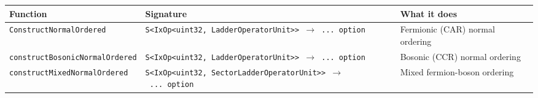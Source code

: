 \documentclass[
  11pt,
  oneside]{book}
\begin{document}
\begin{longtable}[]{@{}
  >{\raggedright\arraybackslash}p{}
  >{\raggedright\arraybackslash}p{}
  >{\raggedright\arraybackslash}p{}@{}}
\toprule\noalign{}
\begin{minipage}[b]{\linewidth}\raggedright
Function
\end{minipage} & \begin{minipage}[b]{\linewidth}\raggedright
Signature
\end{minipage} & \begin{minipage}[b]{\linewidth}\raggedright
What it does
\end{minipage} \\
\midrule\noalign{}
\endhead
\bottomrule\noalign{}
\endlastfoot
\texttt{ConstructNormalOrdered} &
\texttt{S\textless{}IxOp\textless{}uint32,\ LadderOperatorUnit\textgreater{}\textgreater{}\ $\rightarrow$\ ...\ option}
& Fermionic (CAR) normal ordering \\
\texttt{constructBosonicNormalOrdered} &
\texttt{S\textless{}IxOp\textless{}uint32,\ LadderOperatorUnit\textgreater{}\textgreater{}\ $\rightarrow$\ ...\ option}
& Bosonic (CCR) normal ordering \\
\texttt{constructMixedNormalOrdered} &
\texttt{S\textless{}IxOp\textless{}uint32,\ SectorLadderOperatorUnit\textgreater{}\textgreater{}\ $\rightarrow$\ ...\ option}
& Mixed fermion-boson ordering \\
\end{longtable}

\backmatter
\end{document}
